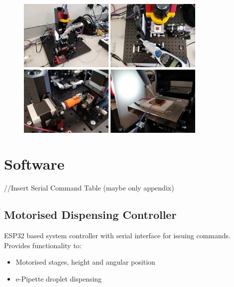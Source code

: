 \begin{figure}[h]
    \centering
    \includegraphics[width=0.4\textwidth]{img/full_sys.jpg}
    \includegraphics[width=0.4\textwidth]{img/impl_sys_top.jpg}
    \includegraphics[width=0.4\textwidth]{img/impl_coup.jpg}
    \includegraphics[width=0.4\textwidth]{img/new_stack.jpg}
\end{figure}

\section{Software}

//Insert Serial Command Table (maybe only appendix)

\subsection{Motorised Dispensing Controller}
ESP32 based system controller with serial interface for issuing commands. Provides functionality to:
\begin{itemize}
    \item Motorised stages, height and angular position
    \item e-Pipette droplet dispensing 
\end{itemize}

